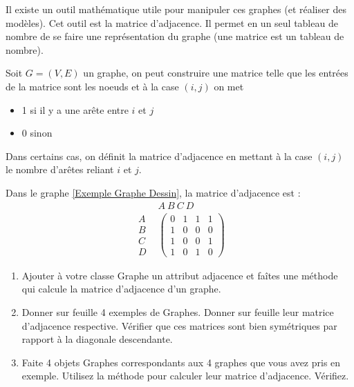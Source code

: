 \documentclass[12pt,fleqn]{article} %
\begin{document}
Il existe un outil mathématique utile pour manipuler ces graphes (et réaliser des modèles). Cet outil est la matrice d'adjacence. Il permet en un seul tableau de nombre de se faire une représentation du graphe (une matrice est un tableau de nombre).
\begin{definition}
	Soit $G = (V,E)$ un graphe, on peut construire une matrice telle que les entrées de la matrice sont les noeuds et à la case $(i,j)$ on met \begin{itemize}
		\item 1 si il y a une arête entre $i$ et $j$
		\item 0 sinon
	\end{itemize}
\end{definition}

\begin{remark}
	Dans certains cas, on définit la matrice d'adjacence en mettant à la case $(i,j)$ le nombre d'arêtes reliant $i$ et $j$.	
\end{remark}

\begin{example}
	Dans le graphe \ref{Exemple Graphe Dessin}, la matrice d'adjacence est : \[
	\begin{array}{rc}
		& A\ B\ C\ D \\
		\begin{array}{c}
			A \\ B \\ C \\D
		\end{array} & \left(\begin{array}{cccc}
		0 & 1 & 1 & 1\\
		1 & 0 & 0 & 0 \\
		1 & 0 & 0 & 1 \\
		1 & 0 & 1 & 0
	\end{array}\right)
	\end{array}
	\]
\end{example}

\begin{exercise}
	\begin{enumerate}
		\item Ajouter à votre classe Graphe un attribut adjacence et faîtes une méthode qui calcule la matrice d'adjacence d'un graphe.
		\item Donner sur feuille 4 exemples de Graphes. Donner sur feuille leur matrice d'adjacence respective. Vérifier que ces matrices sont bien symétriques par rapport à la diagonale descendante.
		\item Faite 4 objets Graphes correspondants aux 4 graphes que vous avez pris en exemple. Utilisez la méthode pour calculer leur matrice d'adjacence. Vérifiez.
	\end{enumerate}
\end{exercise}
\end{document}
